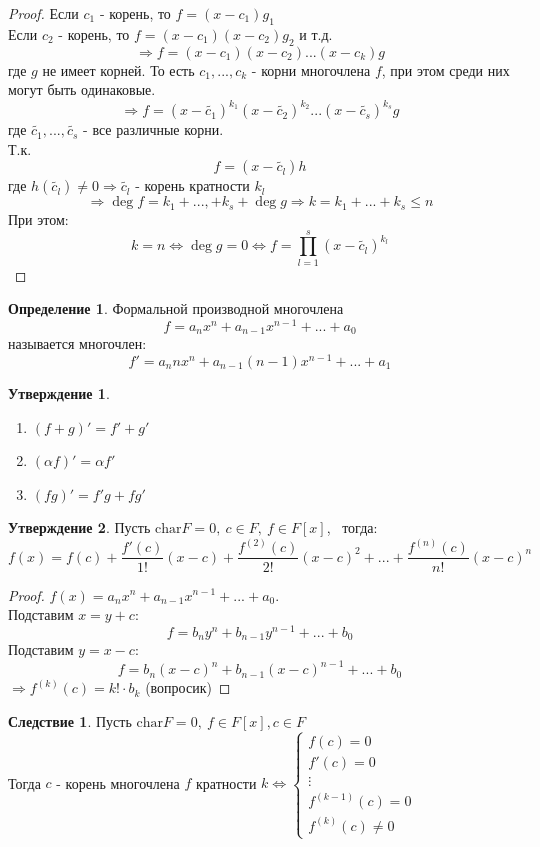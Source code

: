 \documentclass[a4paper, 12pt]{article}
\newcommand\tab[1][.5cm]{\hspace*{#1}}
\theoremstyle{definition}
\newtheorem*{definition}{Определение}
\newtheorem*{consequense}{Следствие}
\newtheorem*{subtheorem}{Утверждение}
\begin{document}
  \begin{proof}
    Если $c_1$ - корень, то $f = (x-c_1)g_1$ \\
    \tab[4.1cm]Если $c_2$ - корень, то $f = (x-c_1)(x-c_2)g_2$ и т.д. 
    $$\Longrightarrow f = (x-c_1)(x-c_2)...(x-c_k)g$$
    где $g$ не имеет корней. То есть $c_1,...,c_k$ - корни многочлена $f$, при этом среди них могут быть одинаковые.
    $$\Longrightarrow f = (x-\widetilde{c_1})^{k_1}(x-\widetilde{c_2})^{k_2}...(x-\widetilde{c_s})^{k_s}g$$
    где $\widetilde{c_1},...,\widetilde{c_s}$ - все различные корни.\\ Т.к. $$f = (x-\widetilde{c_l})h$$ 
    где $h(\widetilde{c_l}) \neq 0 \Longrightarrow \widetilde{c_l}$ - корень кратности $k_l$ $$\Longrightarrow \deg f = k_1 +...,+k_s + \deg g \Longrightarrow k = k_1+...+k_s \leq n$$
    При этом: $$k=n \Longleftrightarrow \deg g =0 \Longleftrightarrow f = \prod\limits_{l=1}^{s}(x-\widetilde{c_l})^{k_l}$$       
  \end{proof}
  \begin{definition}
    Формальной производной многочлена 
    $$f = a_nx^n + a_{n-1}x^{n-1} + ... + a_0$$
    называется многочлен:
    $$f' = a_nnx^n + a_{n-1}(n-1)x^{n-1} + ... + a_1$$  
  \end{definition}
  \begin{subtheorem}\tab
    \begin{enumerate}
      \item $(f+g)' = f'+g'$
      \item $(\alpha f)' = \alpha f'$
      \item $(fg)' = f'g+fg'$   
    \end{enumerate}
  \end{subtheorem}
  \begin{subtheorem}
    Пусть $\textrm{char} F = 0, \ c \in F, \ f \in F[x]$, \ тогда: 
    $$f(x)=f(c) + \frac{f'(c)}{1!}(x-c) + \frac{f^{(2)}(c)}{2!}(x-c)^2 + ... + \frac{f^{(n)}(c)}{n!}(x-c)^n$$ 
  \end{subtheorem}
  \begin{proof}
    $f(x) = a_nx^n + a_{n-1}x^{n-1} + ... + a_0$.\\ Подставим $x = y+c$: 
    $$f = b_ny^n + b_{n-1}y^{n-1} + ... + b_0$$
    Подставим $y = x - c$:
    $$f = b_n(x-c)^n + b_{n-1}(x-c)^{n-1} + ... + b_0$$ 
    $\Longrightarrow f^{(k)}(c) = k! \cdot b_k$ (вопросик)
  \end{proof}
  \begin{consequense}
    Пусть $\textrm{char} F = 0, \ f \in F[x], c\in F$\\
    Тогда $c$ - корень многочлена $f$ кратности $k \Longleftrightarrow \begin{cases}
      f(c) = 0\\
      f'(c) = 0\\
      \vdots \\
      f^{(k-1)}(c) = 0\\
      f^{(k)}(c) \neq 0
    \end{cases}$    
  \end{consequense}    
\end{document}
